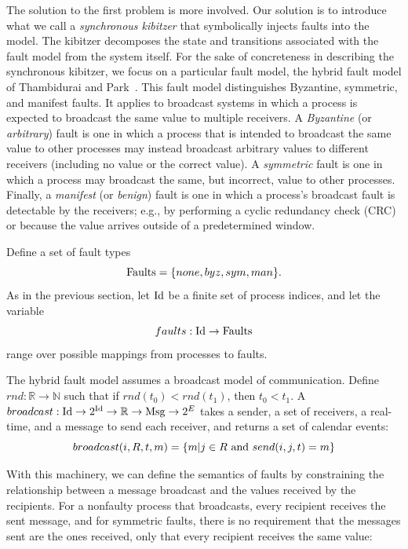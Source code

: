 The solution to the first problem is more involved. Our solution
is to introduce what we call a \emph{synchronous kibitzer} that
symbolically injects faults into the model. The kibitzer decomposes
the state and transitions associated with the fault model from the
system itself. For the sake of concreteness in describing the
synchronous kibitzer, we focus on a particular fault model, the
hybrid fault model of Thambidurai and Park~\cite{Tha88:RDSS}. This fault
model distinguishes Byzantine, symmetric, and manifest faults. It
applies to broadcast systems in which a process is expected to
broadcast the same value to multiple receivers. A \emph{Byzantine}
(or \emph{arbitrary}) fault is one in which a process that is
intended to broadcast the same value to other processes may instead
broadcast arbitrary values to different receivers (including no
value or the correct value). A \emph{symmetric} fault is one in
which a process may broadcast the same, but incorrect, value to
other processes. Finally, a \emph{manifest} (or \emph{benign}) fault
is one in which a process's broadcast fault is detectable by the
receivers; e.g., by performing a cyclic redundancy check (CRC) or
because the value arrives outside of a predetermined window.

Define a set of fault types $$\textnormal{Faults} = \{none, byz,
sym, man\}.$$ As in the previous section, let $\mathrm{Id}$ be a finite set
of process indices, and let the variable $$faults: \mathrm{Id} \rightarrow
\textnormal{Faults}$$ range over possible mappings from processes
to faults.

The hybrid fault model assumes a broadcast model of communication.
Define $rnd: \mathbb{R} \rightarrow \mathbb{N}$ such that if
$rnd(t_0) < rnd(t_1)$, then $t_0 < t_1$.  A $broadcast: \mathrm{Id} \rightarrow
2^{\mathrm{Id}} \rightarrow \mathbb{R} \rightarrow \mathrm{Msg} \rightarrow 2^{E}$
takes a sender, a set of receivers, a real-time, and a message to
send each receiver, and returns a set of calendar events: $$broadcast(i,
R, t, m) = \{m | j \in R \textnormal{ and } send(i, j, t) = m\}$$

With this machinery, we can define the semantics of faults by
constraining the relationship between a message broadcast and the
values received by the recipients. For a nonfaulty process that
broadcasts, every recipient receives the sent message, and for
symmetric faults, there is no requirement that the messages sent
are the ones received, only that every recipient receives the same
value:

